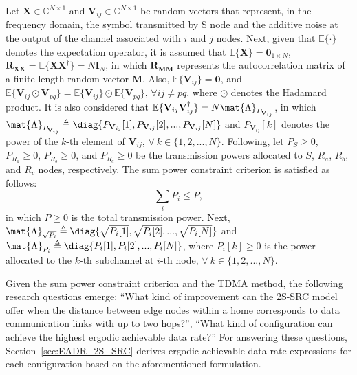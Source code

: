 Let $\mathbf{X} \in \mathbb{C}^{N \times 1}$ and $ \mathbf{V}_{ij} \in \mathbb{C}^{N \times 1}$ be random vectors that represent, in the frequency domain, the symbol transmitted by S node and the additive noise at the output of the channel associated with $i$ and $j$ nodes. Next, given that $\mathbb{E}\{\cdot\}$ denotes the expectation operator, it is assumed that $ \mathbb{E}\{\mathbf{X}\} =  \mathbf{0}_{1\times N}  $,  $ \mathbf{R}_{\mathbf{X}\mathbf{X}} = \mathbb{E}\{\mathbf{X}\mathbf{X}^\dagger\} = N \mathbf{I}_{N} $, in which $\mathbf{R}_{\mathbf{MM}}$ represents the autocorrelation matrix of a finite-length random vector $\mathbf{M}$. Also, $ \mathbb{E}\{\mathbf{V}_{ij}\} = \mathbf{0} $, and $ \mathbb{E}\{\mathbf{V}_{ij}\odot\mathbf{V}_{pq}\} = \mathbb{E}\{\mathbf{V}_{ij}\} \odot \mathbb{E}\{\mathbf{V}_{pq}\} $, $ \forall ij \neq pq $, where $\odot$ denotes the Hadamard product. It is also considered that $ \mathbb{E}\{\mathbf{V}_{ij}\mathbf{V}_{ij}^\dagger\} = N \mat{\Lambda}_{P_{\mathbf{V}_{ij}}}$, in which  $\mat{\Lambda}_{P_{\mathbf{V}_{ij}}} \triangleq \diag\{P_{\mathbf{V}_{ij}}[1],P_{\mathbf{V}_{ij}}[2],...,P_{\mathbf{V}_{ij}}[N]\} $ and $ P_{\mathbf{V}_{ij}}[k] $ denotes the power of the $k$-th element of $\mathbf{V}_{ij}$, $ \forall \ k \in \{1,2,...,N\} $. Following, let $ P_{S} \geq 0 $, $ P_{R_{a}} \geq 0  $, $ P_{R_{b}} \geq 0  $, and $ P_{R_{c}} \geq 0  $ be the transmission powers allocated to $S$, $R_{a}$, $R_{b}$, and $R_{c}$ nodes, respectively. The sum power constraint criterion is satisfied as follows:
\begin{equation}
\sum_{i} P_{i} \leq P,
\end{equation}
in which $P \geq 0$ is the total transmission power. Next, $ \mat{\Lambda}_{\sqrt{P_{i}}} \triangleq \diag\{\sqrt{P_{i}[1]},\sqrt{P_{i}[2]},...,\sqrt{P_{i}[N]}\}$ and $ \mat{\Lambda}_{P_{i}} \triangleq \diag\{P_{i}[1],P_{i}[2],...,P_{i}[N]\}$, where $ P_{i}[k] \geq 0 $ is the power allocated to the $k$-th subchannel at $i$-th node, $ \forall \ k \in \{1,2,...,N\} $.

Given the sum power constraint criterion and the \ac{TDMA} method, the following research questions emerge: ``What kind of improvement can the \ac{2S-SRC} model offer when the distance between edge nodes within a home corresponds to data communication links with up to two hops?'', ``What kind of configuration can achieve the highest ergodic achievable data rate?'' For answering these questions, Section~\ref{sec:EADR_2S_SRC} derives ergodic achievable data rate expressions for each configuration based on the aforementioned formulation.

